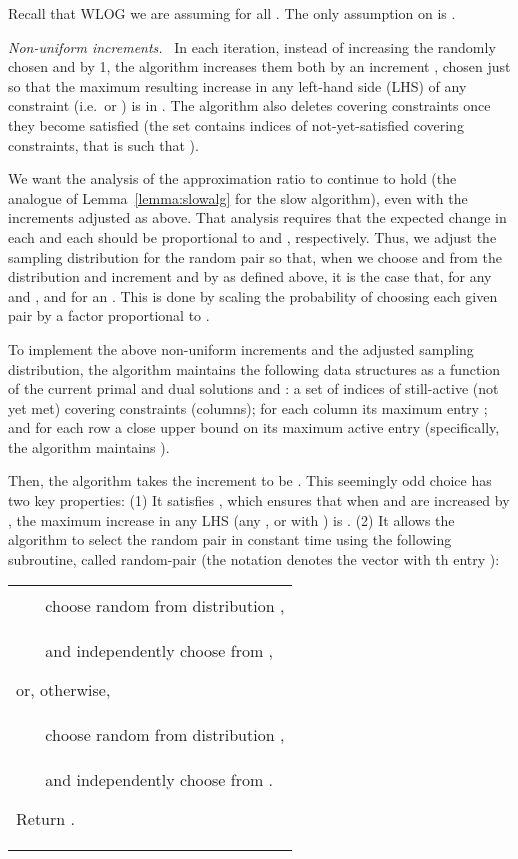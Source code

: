 \documentclass[11pt]{svjour3} \usepackage{fullpage}
\makeatletter
\renewcommand{\paragraph}[1]{\smallskip\vspace{2pt}\par{\em #1}~}
\newcommand{\algfont}{}
\newcounter{myline}
\newenvironment{alg}{
  \medskip
  \par
  \algfont
  \centering
    \begin{tabular}{|@{}|l|}\hline
      \begin{minipage}{0.96\linewidth}\raggedright
          \smallskip
          \begin{list}{\arabic{myline}.}{
            \usecounter{myline}
            \setlength{\listparindent}{0in}
            \setlength{\topsep}{0in}
            \setlength{\itemsep}{.013in}
            \setlength{\parsep}{.013in}
            \setlength{\rightmargin}{0in}
            \setlength{\itemindent}{0in}
\setlength{\labelsep}{0.065in}
            \setlength{\leftmargin}{0.2in}
}
          }{
        \end{list}
        \smallskip
      \end{minipage}\\\hline
    \end{tabular}
    \par
    \noindent
}
\newcommand{\A}{\item}
\newcommand{\Ahead}[1]{\item[]\hspace*{-\leftmargin}{\textrm{#1}}}
\makeatother
\begin{document}
Recall that WLOG we are assuming  for all .
The only assumption on  is .

\paragraph{Non-uniform increments.}
In each iteration, instead of increasing the randomly chosen  and  by 1, the algorithm increases them both by an increment , chosen just so that the maximum resulting increase in any left-hand side (LHS) of any constraint  (i.e.\  or ) is in .  
The algorithm also deletes covering constraints once they become satisfied
(the set  contains indices of not-yet-satisfied covering constraints,
that is  such that ).

We want the analysis of the approximation ratio to continue to hold
(the analogue of Lemma~\ref{lemma:slowalg} for the slow algorithm),
even with the increments adjusted as above.
That analysis requires that the expected change in each  and each  should be proportional to  and , respectively.
Thus, we adjust the sampling distribution for the random pair  so that,
when we choose  and  from the distribution
and increment  and  by  as defined above,
it is the case that, for any  and ,
 and  for an .
This is done by scaling the probability of choosing each given  pair by a factor proportional to .

To implement the above non-uniform increments 
and the adjusted sampling distribution,
the algorithm maintains the following data structures
as a function of the current primal and dual solutions  and :
a set  of indices of still-active (not yet met) covering constraints (columns);
for each column  its maximum entry ;
and for each row  a close upper bound  on its maximum active entry 
(specifically, the algorithm maintains ).

Then, the algorithm takes the increment  to be .
This seemingly odd choice has two key properties:
(1) It satisfies ,
which ensures that when  and  are increased by ,
the maximum increase in any LHS (any , or  with )
is .
(2) It allows the algorithm to select the random pair  in constant time using the following subroutine, called {\algfont random-pair} (the notation  denotes the vector with th entry ):



\begin{alg}
\Ahead{{\algfont\bf random-pair}}

\A With probability

\\ ~~~ choose random  from distribution  , 
\\ ~~~ and independently choose  from ,

\A or, otherwise,
\\ ~~~ choose random  from distribution , 
\\ ~~~ and independently choose  from .

\A Return .
\end{alg}
\smallskip
\end{document}
